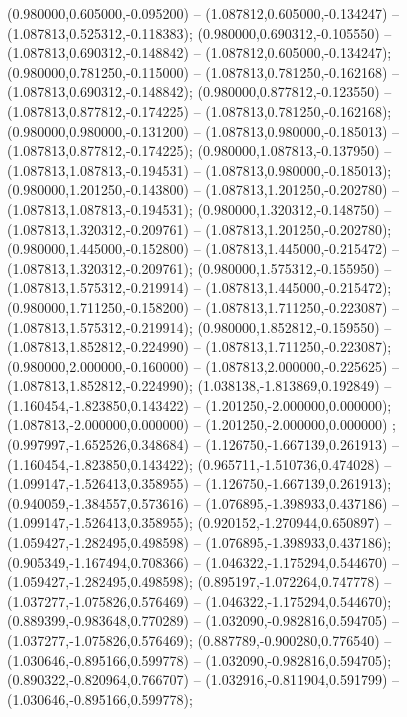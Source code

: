  (0.980000,0.605000,-0.095200) -- (1.087812,0.605000,-0.134247) -- (1.087813,0.525312,-0.118383);
 (0.980000,0.690312,-0.105550) -- (1.087813,0.690312,-0.148842) -- (1.087812,0.605000,-0.134247);
 (0.980000,0.781250,-0.115000) -- (1.087813,0.781250,-0.162168) -- (1.087813,0.690312,-0.148842);
 (0.980000,0.877812,-0.123550) -- (1.087813,0.877812,-0.174225) -- (1.087813,0.781250,-0.162168);
 (0.980000,0.980000,-0.131200) -- (1.087813,0.980000,-0.185013) -- (1.087813,0.877812,-0.174225);
 (0.980000,1.087813,-0.137950) -- (1.087813,1.087813,-0.194531) -- (1.087813,0.980000,-0.185013);
 (0.980000,1.201250,-0.143800) -- (1.087813,1.201250,-0.202780) -- (1.087813,1.087813,-0.194531);
 (0.980000,1.320312,-0.148750) -- (1.087813,1.320312,-0.209761) -- (1.087813,1.201250,-0.202780);
 (0.980000,1.445000,-0.152800) -- (1.087813,1.445000,-0.215472) -- (1.087813,1.320312,-0.209761);
 (0.980000,1.575312,-0.155950) -- (1.087813,1.575312,-0.219914) -- (1.087813,1.445000,-0.215472);
 (0.980000,1.711250,-0.158200) -- (1.087813,1.711250,-0.223087) -- (1.087813,1.575312,-0.219914);
 (0.980000,1.852812,-0.159550) -- (1.087813,1.852812,-0.224990) -- (1.087813,1.711250,-0.223087);
 (0.980000,2.000000,-0.160000) -- (1.087813,2.000000,-0.225625) -- (1.087813,1.852812,-0.224990);
 (1.038138,-1.813869,0.192849) -- (1.160454,-1.823850,0.143422) -- (1.201250,-2.000000,0.000000);
 (1.087813,-2.000000,0.000000) -- (1.201250,-2.000000,0.000000) ;
 (0.997997,-1.652526,0.348684) -- (1.126750,-1.667139,0.261913) -- (1.160454,-1.823850,0.143422);
 (0.965711,-1.510736,0.474028) -- (1.099147,-1.526413,0.358955) -- (1.126750,-1.667139,0.261913);
 (0.940059,-1.384557,0.573616) -- (1.076895,-1.398933,0.437186) -- (1.099147,-1.526413,0.358955);
 (0.920152,-1.270944,0.650897) -- (1.059427,-1.282495,0.498598) -- (1.076895,-1.398933,0.437186);
 (0.905349,-1.167494,0.708366) -- (1.046322,-1.175294,0.544670) -- (1.059427,-1.282495,0.498598);
 (0.895197,-1.072264,0.747778) -- (1.037277,-1.075826,0.576469) -- (1.046322,-1.175294,0.544670);
 (0.889399,-0.983648,0.770289) -- (1.032090,-0.982816,0.594705) -- (1.037277,-1.075826,0.576469);
 (0.887789,-0.900280,0.776540) -- (1.030646,-0.895166,0.599778) -- (1.032090,-0.982816,0.594705);
 (0.890322,-0.820964,0.766707) -- (1.032916,-0.811904,0.591799) -- (1.030646,-0.895166,0.599778);
